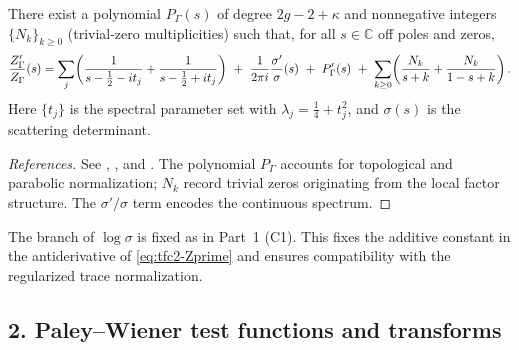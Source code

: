 \begin{theorem}\relax\hspace{0pt}
\label{thm:tfc2-Zprime} %
There exist a polynomial $P_\Gamma(s)$ of degree $2g-2+\kappa$ and nonnegative integers $\{N_k\}_{k\ge0}$ (trivial-zero multiplicities) such that, for all $s\in\mathbb{C}$ off poles and zeros,
\begin{equation}\relax\hspace{0pt}
\label{eq:tfc2-Zprime}\relax\hspace{0pt}
\frac{Z'_\Gamma}{Z_\Gamma}(s)=
\sum_{j}\!\left(\frac{1}{s-\tfrac12-it_j}+\frac{1}{s-\tfrac12+it_j}\right)
\ +\ \frac{1}{2\pi i}\frac{\sigma'}{\sigma}(s)
\ +\ P'_\Gamma(s)\ +\ \sum_{k\ge0}\!\left(\frac{N_k}{s+k}+\frac{N_k}{1-s+k}\right).
\end{equation}
Here $\{t_j\}$ is the spectral parameter set with $\lambda_j=\tfrac14+t_j^2$, and $\sigma(s)$ is the scattering determinant.\relax\hspace{0pt}
\end{theorem}

\begin{proof}[References]\relax\hspace{0pt}
See \cite[Ch.~6--7]{HejhalII}, \cite[Ch.~10]{IwaniecSpectral}, and \cite[Ch.~5--7]{Borthwick}. The polynomial $P_\Gamma$ accounts for topological and parabolic normalization; $N_k$ record trivial zeros originating from the local factor structure. The $\sigma'/\sigma$ term encodes the continuous spectrum.\relax\hspace{0pt}
\end{proof}

\begin{remark}\relax\hspace{0pt}
\label{rem:tfc2-branch} %
The branch of $\log \sigma$ is fixed as in Part~1 (C1). This fixes the additive constant in the antiderivative of \eqref{eq:tfc2-Zprime} and ensures compatibility with the regularized trace normalization.\relax\hspace{0pt}
\end{remark}

\subsection*{2. Paley--Wiener test functions and transforms}\relax\hspace{0pt}
\label{subsec:tfc2-PW} %

